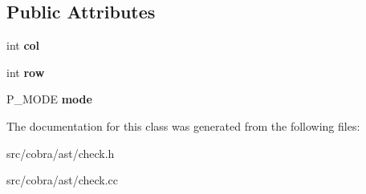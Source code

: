 \subsection*{Public Attributes}
\begin{DoxyCompactItemize}
\item 
\hypertarget{class_cobra_1_1internal_1_1_check_a5ac845f4fe07186c2b175c5021cf3205}{int {\bfseries col}}\label{class_cobra_1_1internal_1_1_check_a5ac845f4fe07186c2b175c5021cf3205}

\item 
\hypertarget{class_cobra_1_1internal_1_1_check_aa5dab76efd3b801cd18d56b0806ca020}{int {\bfseries row}}\label{class_cobra_1_1internal_1_1_check_aa5dab76efd3b801cd18d56b0806ca020}

\item 
\hypertarget{class_cobra_1_1internal_1_1_check_a6f5deafc1eef93eaa87ae32035d17250}{P\+\_\+\+M\+O\+D\+E {\bfseries mode}}\label{class_cobra_1_1internal_1_1_check_a6f5deafc1eef93eaa87ae32035d17250}

\end{DoxyCompactItemize}


The documentation for this class was generated from the following files\+:\begin{DoxyCompactItemize}
\item 
src/cobra/ast/check.\+h\item 
src/cobra/ast/check.\+cc\end{DoxyCompactItemize}
